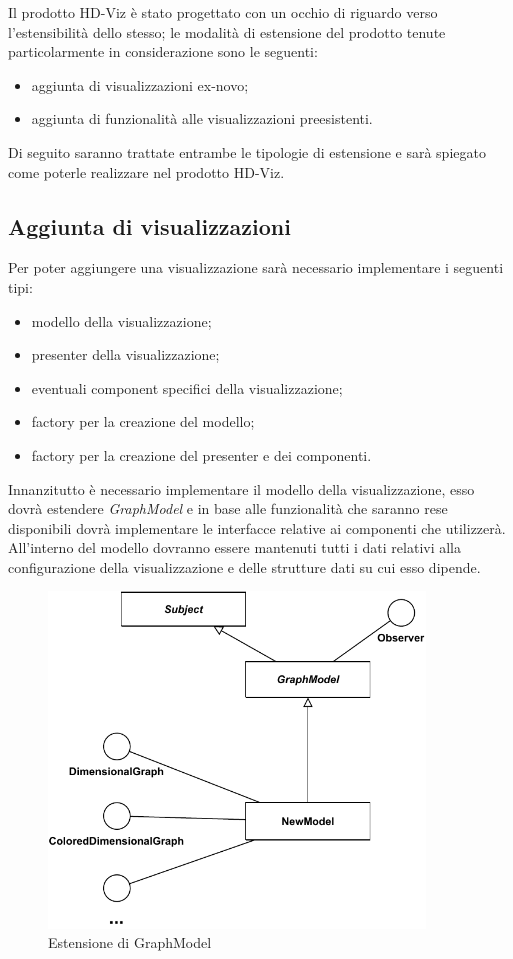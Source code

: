 \documentclass[../manuale_sviluppatore.tex]{subfiles}
\begin{document}
Il prodotto HD-Viz è stato progettato con un occhio di riguardo verso l'estensibilità dello stesso; 
le modalità di estensione del prodotto tenute particolarmente in considerazione sono le seguenti:
\begin{itemize}
	\item aggiunta di visualizzazioni ex-novo;
	\item aggiunta di funzionalità alle visualizzazioni preesistenti.
\end{itemize}
Di seguito saranno trattate entrambe le tipologie di estensione e sarà spiegato come poterle 
realizzare nel prodotto HD-Viz.

\subsection{Aggiunta di visualizzazioni}
Per poter aggiungere una visualizzazione sarà necessario implementare i seguenti tipi:
\begin{itemize}
	\item modello della visualizzazione;
	\item presenter della visualizzazione;
	\item eventuali component specifici della visualizzazione;
	\item factory per la creazione del modello;
	\item factory per la creazione del presenter e dei componenti.
\end{itemize}

Innanzitutto è necessario implementare il modello della visualizzazione, esso dovrà estendere 
\emph{GraphModel} e in base alle funzionalità che saranno rese disponibili dovrà implementare le 
interfacce relative ai componenti che utilizzerà. All'interno del modello dovranno essere mantenuti 
tutti i dati relativi alla configurazione della visualizzazione e delle strutture dati su cui esso 
dipende.

\begin{figure}[H]
	\centering
	\includegraphics[width=10cm]{src/img/extendModel.pdf}
	\caption{Estensione di GraphModel}
\end{figure}
\end{document}
